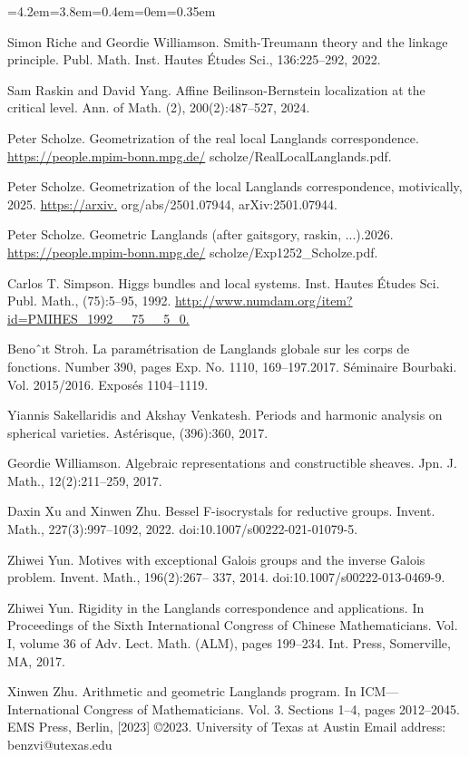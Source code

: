 \begin{list}{}{\leftmargin=4.2em=3.8em=0.4em\itemindent=0em\parsep=0.35em}
\item[{RW22}] Simon Riche and Geordie Williamson. Smith-Treumann theory and the linkage principle. Publ. Math. Inst. Hautes Études Sci., 136:225–292, 2022.
\item[{RY24}] Sam Raskin and David Yang. Affine Beilinson-Bernstein localization at the critical level. Ann. of Math. (2), 200(2):487–527, 2024.
\item[{Sch}] Peter Scholze. Geometrization of the real local Langlands correspondence. \url{https://people.mpim-bonn.mpg.de/} scholze/RealLocalLanglands.pdf.
\item[{Sch25}] Peter Scholze. Geometrization of the local Langlands correspondence, motivically, 2025. \url{https://arxiv.} org/abs/2501.07944, arXiv:2501.07944.
\item[{Sch26}] Peter Scholze. Geometric Langlands (after gaitsgory, raskin, ...).2026. \url{https://people.mpim-bonn.mpg.de/} scholze/Exp1252\_Scholze.pdf.
\item[{Sim92}] Carlos T. Simpson. Higgs bundles and local systems. Inst. Hautes Études Sci. Publ. Math., (75):5–95, 1992. \url{http://www.numdam.org/item?id=PMIHES\_1992\_\_75\_\_5\_0.}
\item[{Str17}] Benoˆıt Stroh. La paramétrisation de Langlands globale sur les corps de fonctions. Number 390, pages Exp. No. 1110, 169–197.2017. Séminaire Bourbaki. Vol. 2015/2016. Exposés 1104–1119.
\item[{SV17}] Yiannis Sakellaridis and Akshay Venkatesh. Periods and harmonic analysis on spherical varieties. Astérisque, (396):360, 2017.
\item[{Wil17}] Geordie Williamson. Algebraic representations and constructible sheaves. Jpn. J. Math., 12(2):211–259, 2017.
\item[{XZ22}] Daxin Xu and Xinwen Zhu. Bessel F-isocrystals for reductive groups. Invent. Math., 227(3):997–1092, 2022. doi:10.1007/s00222-021-01079-5.
\item[{Yun14}] Zhiwei Yun. Motives with exceptional Galois groups and the inverse Galois problem. Invent. Math., 196(2):267– 337, 2014. doi:10.1007/s00222-013-0469-9.
\item[{Yun17}] Zhiwei Yun. Rigidity in the Langlands correspondence and applications. In Proceedings of the Sixth International Congress of Chinese Mathematicians. Vol. I, volume 36 of Adv. Lect. Math. (ALM), pages 199–234. Int. Press, Somerville, MA, 2017.
\item[{Zhu23}] Xinwen Zhu. Arithmetic and geometric Langlands program. In ICM—International Congress of Mathematicians. Vol. 3. Sections 1–4, pages 2012–2045. EMS Press, Berlin, [2023] ©2023. University of Texas at Austin Email address: benzvi@utexas.edu
\end{list}